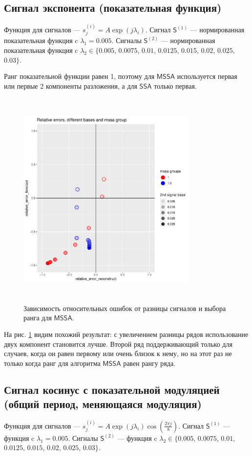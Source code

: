 \documentclass[specialist, substylefile = spbureport.rtx,
    subf,href,colorlinks=true, 12pt]{disser}
\newcommand{\sfS}{\mathsf{S}}
\newcommand{\SSA}{\mathsf{SSA}}
\newcommand{\MSSA}{\mathsf{MSSA}}
\begin{document}
    \subsection{Сигнал экспонента (показательная функция)}
        Функция для сигналов --- $s^{(i)}_j = A \exp(j\lambda_i)$.
        Сигнал $\sfS^{(1)}$ --- нормированная показательная функция c $\lambda_1 = 0.005$.
        Сигналы $\sfS^{(2)}$ --- нормированная показательная функция c $\lambda_2 \in \{0.005$, $0.0075$, $0.01$, $0.0125$, $0.015$, $0.02$, $0.025$, $0.03\}$.

        Ранг показательной функции равен 1, поэтому для $\MSSA$ используется первая или первые 2 компоненты разложения, а для $\SSA$ только первая.

        \begin{figure}[h]
            \centering
            \includegraphics[height=11cm, width=0.8\textwidth]{experiment_1_exp.pdf}
            \caption{Зависимость относительных ошибок от разницы сигналов и выбора ранга для $\MSSA$.}
            \label{fig:exp1_exp}
        \end{figure}

        На рис. \ref{fig:exp1_exp} видим похожий результат: с увеличением разницы рядов использование двух компонент становится лучше. Второй ряд поддерживающий только для случаев, когда он равен первому или очень близок к нему, но на этот раз не только когда ранг для алгоритма $\MSSA$ равен рангу ряда.

    \subsection{Сигнал косинус с показательной модуляцией (общий период, меняющаяся модуляция)}
        Функция для сигналов --- $s^{(i)}_j = A \exp(j\lambda_i) \cos(\frac{2\pi j}{8})$.
        Сигнал $\sfS^{(1)}$ --- функция c $\lambda_1 = 0.005$.
        Сигналы $\sfS^{(2)}$ --- функция c $\lambda_2 \in \{0.005$, $0.0075$, $0.01$, $0.0125$, $0.015$, $0.02$, $0.025$, $0.03\}$.
\end{document}
